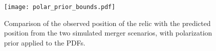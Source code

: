 \label{app: results}
\begin{figure}
	\texttt{[image: polar\_prior\_bounds.pdf]}
	\caption{Comparison of the observed position of the relic with the
	predicted position from the two simulated merger scenarios, with
	polarization prior applied to the PDFs.
	\label{polarprior_bounds}}
\end{figure}

